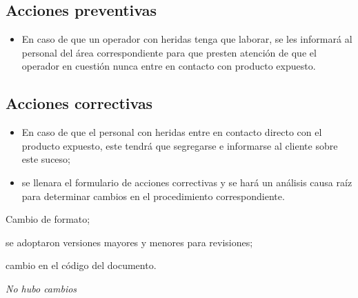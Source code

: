 \subsection{Acciones preventivas}
\begin{itemize}
	\item En caso de que un operador con heridas tenga que laborar, se les informará al personal del área correspondiente para que presten atención de que el operador en cuestión nunca entre en contacto con producto expuesto.
\end{itemize}

\subsection{Acciones correctivas}
\begin{itemize}
	\item En caso de que el personal con heridas entre en contacto directo con el producto expuesto, este tendrá que segregarse e informarse al cliente sobre este suceso;
	\item se llenara el formulario de acciones correctivas y se hará un análisis causa raíz para determinar cambios en el procedimiento correspondiente.
\end{itemize}

\begin{changelog}[title=Registro de cambios,simple, sectioncmd=\subsection*,label=changelog-\thesection-\MayorVer.\MenorVer]
	\begin{version}[v=2.1, date=2023--01, author=Pablo E. Alanis]
			\item Cambio de formato;
			\item se adoptaron versiones mayores y menores para revisiones;
			\item cambio en el código del documento.
	\end{version}

	\begin{version}[v=1.8, date=2022--05, author=Alonso M.]
		\item \textit{No hubo cambios}
	\end{version}
\end{changelog}